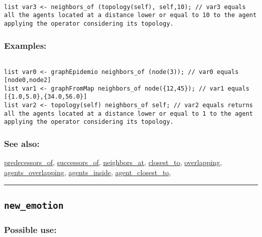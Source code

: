 \documentclass[]{book}
\theoremstyle{definition}
\theoremstyle{definition}
\theoremstyle{definition}
\theoremstyle{remark}
\begin{document}
\begin{verbatim}
 
list var3 <- neighbors_of (topology(self), self,10); // var3 equals all the agents located at a distance lower or equal to 10 to the agent applying the operator considering its topology.
\end{verbatim}

\subsubsection{Examples:}\label{examples-254}

\begin{verbatim}
 
list var0 <- graphEpidemio neighbors_of (node(3)); // var0 equals [node0,node2] 
list var1 <- graphFromMap neighbors_of node({12,45}); // var1 equals [{1.0,5.0},{34.0,56.0}] 
list var2 <- topology(self) neighbors_of self; // var2 equals returns all the agents located at a distance lower or equal to 1 to the agent applying the operator considering its topology.
\end{verbatim}

\subsubsection{See also:}\label{see-also-147}

\href{OperatorsNR\#predecessors_of}{predecessors\_of},
\href{OperatorsSZ\#successors_of}{successors\_of},
\href{OperatorsNR\#neighbors_at}{neighbors\_at},
\href{OperatorsBC\#closest_to}{closest\_to},
\href{OperatorsNR\#overlapping}{overlapping},
\href{OperatorsAA\#agents_overlapping}{agents\_overlapping},
\href{OperatorsAA\#agents_inside}{agents\_inside},
\href{OperatorsAA\#agent_closest_to}{agent\_closest\_to},

\begin{center}\rule{0.5\linewidth}{\linethickness}\end{center}

\subsection{\texorpdfstring{\texttt{new\_emotion}}{new\_emotion}}\label{new_emotion}

\subsubsection{Possible use:}\label{possible-use-368}
\end{document}
